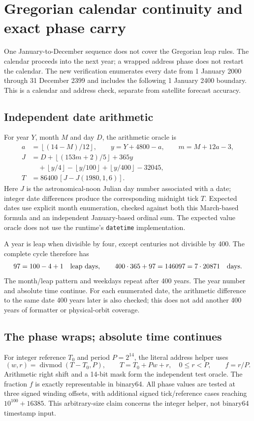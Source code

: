 \section{Gregorian calendar continuity and exact phase carry}
\label{sec:calendar-phase}

One January-to-December sequence does not cover the Gregorian leap rules. The
calendar proceeds into the next year; a wrapped address phase does not restart
the calendar. The new verification enumerates every date from 1 January 2000
through 31 December 2399 and includes the following 1 January 2400 boundary.
This is a calendar and address check, separate from satellite forecast accuracy.

\subsection{Independent date arithmetic}
For year $Y$, month $M$ and day $D$, the arithmetic oracle is
\begin{align*}
a&=\left\lfloor(14-M)/12\right\rfloor,\qquad
y=Y+4800-a,\qquad m=M+12a-3,\\
J&=D+\left\lfloor(153m+2)/5\right\rfloor+365y\\
 &\quad+\left\lfloor y/4\right\rfloor-\left\lfloor y/100\right\rfloor
 +\left\lfloor y/400\right\rfloor-32045,\\
T&=86400\,[J-J(1980,1,6)].
\end{align*}
Here $J$ is the astronomical-noon Julian day number associated with a date;
integer date differences produce the corresponding midnight tick $T$.
Expected dates use explicit month enumeration, checked against both this
March-based formula and an independent January-based ordinal sum. The expected
value oracle does not use the runtime's \texttt{datetime} implementation.

A year is leap when divisible by four, except centuries not divisible by 400.
The complete cycle therefore has
\[
97=100-4+1\quad\hbox{leap days},\qquad
400\cdot365+97=146097=7\cdot20871\quad\hbox{days}.
\]
The month/leap pattern and weekdays repeat after 400 years. The year number and
absolute time continue. For each enumerated date, the arithmetic difference
to the same date 400 years later is also checked; this does not add another
400 years of formatter or physical-orbit coverage.

\subsection{The phase wraps; absolute time continues}
For integer reference $T_0$ and period $P=2^{14}$, the literal address helper uses
\[
(w,r)=\operatorname{divmod}(T-T_0,P),\qquad
T=T_0+Pw+r,\quad 0\le r<P,\qquad f=r/P.
\]
Arithmetic right shift and a 14-bit mask form the independent test oracle.
The fraction $f$ is exactly representable in binary64. All phase values are
tested at three signed winding offsets, with additional signed tick/reference
cases reaching $10^{100}+16385$. This arbitrary-size claim concerns the integer
helper, not binary64 timestamp input.

